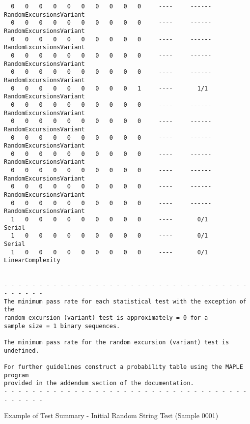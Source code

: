 \begin{code}
\begin{verbatim}
  0   0   0   0   0   0   0   0   0   0     ----     ------     RandomExcursionsVariant
  0   0   0   0   0   0   0   0   0   0     ----     ------     RandomExcursionsVariant
  0   0   0   0   0   0   0   0   0   0     ----     ------     RandomExcursionsVariant
  0   0   0   0   0   0   0   0   0   0     ----     ------     RandomExcursionsVariant
  0   0   0   0   0   0   0   0   0   0     ----     ------     RandomExcursionsVariant
  0   0   0   0   0   0   0   0   0   1     ----       1/1       RandomExcursionsVariant
  0   0   0   0   0   0   0   0   0   0     ----     ------     RandomExcursionsVariant
  0   0   0   0   0   0   0   0   0   0     ----     ------     RandomExcursionsVariant
  0   0   0   0   0   0   0   0   0   0     ----     ------     RandomExcursionsVariant
  0   0   0   0   0   0   0   0   0   0     ----     ------     RandomExcursionsVariant
  0   0   0   0   0   0   0   0   0   0     ----     ------     RandomExcursionsVariant
  0   0   0   0   0   0   0   0   0   0     ----     ------     RandomExcursionsVariant
  0   0   0   0   0   0   0   0   0   0     ----     ------     RandomExcursionsVariant
  1   0   0   0   0   0   0   0   0   0     ----       0/1       Serial
  1   0   0   0   0   0   0   0   0   0     ----       0/1       Serial
  1   0   0   0   0   0   0   0   0   0     ----       0/1       LinearComplexity


- - - - - - - - - - - - - - - - - - - - - - - - - - - - - - - - - - - - - - - - -
The minimum pass rate for each statistical test with the exception of the
random excursion (variant) test is approximately = 0 for a
sample size = 1 binary sequences.

The minimum pass rate for the random excursion (variant) test is undefined.

For further guidelines construct a probability table using the MAPLE program
provided in the addendum section of the documentation.
- - - - - - - - - - - - - - - - - - - - - - - - - - - - - - - - - - - - - - - - -
    \end{verbatim}
    \caption{Example of Test Summary - Initial Random String Test (Sample 0001)}
    \label{lst:samp_nist_sum}
\end{code}